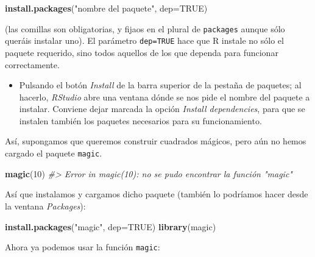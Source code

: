 \documentclass[
]{book}
\newenvironment{Shaded}{\begin{snugshade}}{\end{snugshade}}
\newcommand{\CommentTok}[1]{\textcolor[rgb]{0.56,0.35,0.01}{\textit{#1}}}
\newcommand{\DataTypeTok}[1]{\textcolor[rgb]{0.13,0.29,0.53}{#1}}
\newcommand{\DecValTok}[1]{\textcolor[rgb]{0.00,0.00,0.81}{#1}}
\newcommand{\KeywordTok}[1]{\textcolor[rgb]{0.13,0.29,0.53}{\textbf{#1}}}
\newcommand{\NormalTok}[1]{#1}
\newcommand{\OtherTok}[1]{\textcolor[rgb]{0.56,0.35,0.01}{#1}}
\newcommand{\StringTok}[1]{\textcolor[rgb]{0.31,0.60,0.02}{#1}}
\providecommand{\tightlist}{%
  \setlength{\itemsep}{0pt}\setlength{\parskip}{0pt}}
\theoremstyle{definition}
\theoremstyle{definition}
\theoremstyle{definition}
\theoremstyle{remark}
\begin{document}
\begin{Shaded}
\begin{Highlighting}[]
\KeywordTok{install.packages}\NormalTok{(}\StringTok{"nombre del paquete"}\NormalTok{, }\DataTypeTok{dep=}\OtherTok{TRUE}\NormalTok{)}
\end{Highlighting}
\end{Shaded}

(las comillas son obligatorias, y fijaos en el plural de \texttt{packages} aunque sólo queráis instalar uno). El parámetro \texttt{dep=TRUE} hace que R instale no sólo el paquete requerido, sino todos aquellos de los que dependa para funcionar correctamente.

\begin{itemize}
\tightlist
\item
  Pulsando el botón \emph{Install} de la barra superior de la pestaña de paquetes; al hacerlo, \emph{RStudio} abre una ventana dónde se nos pide el nombre del paquete a instalar. Conviene dejar marcada la opción \emph{Install dependencies}, para que se instalen también los paquetes necesarios para su funcionamiento.
\end{itemize}

Así, supongamos que queremos construir cuadrados mágicos, pero aún no hemos cargado el paquete \texttt{magic}.

\begin{Shaded}
\begin{Highlighting}[]
\KeywordTok{magic}\NormalTok{(}\DecValTok{10}\NormalTok{)}
\CommentTok{\#\textgreater{} Error in magic(10): no se pudo encontrar la función "magic"}
\end{Highlighting}
\end{Shaded}

Así que instalamos y cargamos dicho paquete (también lo podríamos hacer desde la ventana \emph{Packages}):

\begin{Shaded}
\begin{Highlighting}[]
\KeywordTok{install.packages}\NormalTok{(}\StringTok{"magic"}\NormalTok{, }\DataTypeTok{dep=}\OtherTok{TRUE}\NormalTok{)}
\KeywordTok{library}\NormalTok{(magic)}
\end{Highlighting}
\end{Shaded}

Ahora ya podemos usar la función \texttt{magic}:
\end{document}
